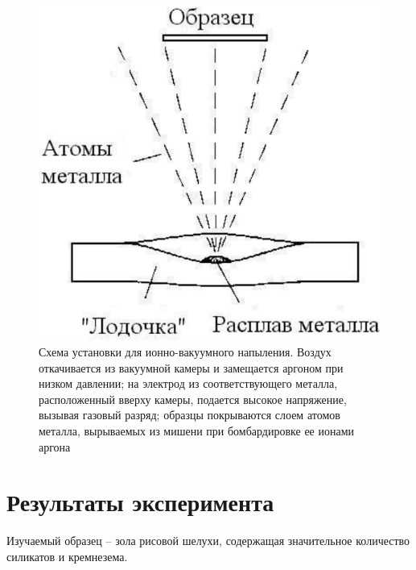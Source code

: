 \documentclass[12pt]{article}
\begin{document}
\begin{figure}[!ht]
\centering
\includegraphics[scale = 0.4]{pictures/boat.png}
\caption{Схема установки для ионно-вакуумного напыления. Воздух откачивается из вакуумной камеры и замещается аргоном при низком давлении; на электрод из соответствующего металла, расположенный вверху камеры, подается высокое напряжение, вызывая газовый разряд; образцы покрываются слоем атомов металла, вырываемых из мишени при бомбардировке ее ионами аргона}
\end{figure}

\section*{Результаты эксперимента}

Изучаемый образец -- зола рисовой шелухи, содержащая значительное количество силикатов и кремнезема. 
\end{document}
